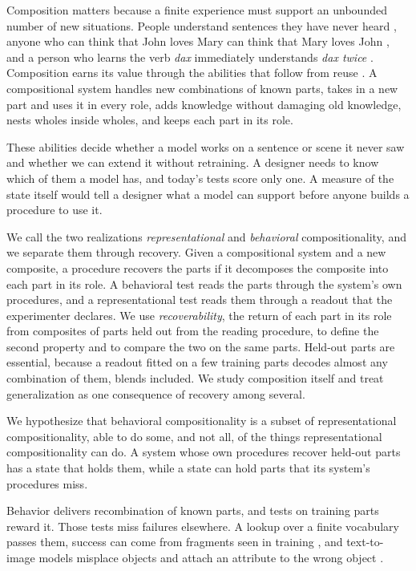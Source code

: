 \documentclass[10pt]{article}
\theoremstyle{plain}
\theoremstyle{remark}
\begin{document}
Composition matters because a finite experience must support an unbounded number of new situations. People understand sentences they have never heard \citep{chomsky1957}, anyone who can think that John loves Mary can think that Mary loves John \citep{fodor1988}, and a person who learns the verb \emph{dax} immediately understands \emph{dax twice} \citep{lake2018}. Composition earns its value through the abilities that follow from reuse \citep{lake2017}. A compositional system handles new combinations of known parts, takes in a new part and uses it in every role, adds knowledge without damaging old knowledge, nests wholes inside wholes, and keeps each part in its role.

These abilities decide whether a model works on a sentence or scene it never saw and whether we can extend it without retraining. A designer needs to know which of them a model has, and today's tests score only one. A measure of the state itself would tell a designer what a model can support before anyone builds a procedure to use it.

We call the two realizations \emph{representational} and \emph{behavioral} compositionality, and we separate them through recovery. Given a compositional system and a new composite, a procedure recovers the parts if it decomposes the composite into each part in its role. A behavioral test reads the parts through the system's own procedures, and a representational test reads them through a readout that the experimenter declares. We use \emph{recoverability}, the return of each part in its role from composites of parts held out from the reading procedure, to define the second property and to compare the two on the same parts. Held-out parts are essential, because a readout fitted on a few training parts decodes almost any combination of them, blends included. We study composition itself and treat generalization as one consequence of recovery among several.

We hypothesize that behavioral compositionality is a subset of representational compositionality, able to do some, and not all, of the things representational compositionality can do. A system whose own procedures recover held-out parts has a state that holds them, while a state can hold parts that its system's procedures miss.

Behavior delivers recombination of known parts, and tests on training parts reward it. Those tests miss failures elsewhere. A lookup over a finite vocabulary passes them, success can come from fragments seen in training \citep{dziri2023}, and text-to-image models misplace objects \citep{conwell2022} and attach an attribute to the wrong object \citep{rassin2022}.
\end{document}
